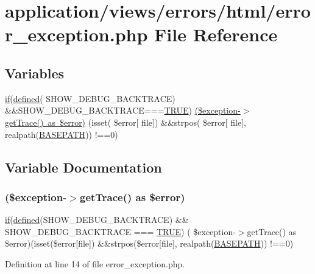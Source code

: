 \hypertarget{html_2error__exception_8php}{}\section{application/views/errors/html/error\+\_\+exception.php File Reference}
\label{html_2error__exception_8php}
\subsection*{Variables}
\begin{DoxyCompactItemize}
\item 
\mbox{\hyperlink{_code_igniter_8php_a68ca62d45495d195f67d234bdafb1d1f}{if}}(\mbox{\hyperlink{password_8php_a74f41c0efe4435fb8ac2133464d3cd57}{defined}}( \textquotesingle{}S\+H\+O\+W\+\_\+\+D\+E\+B\+U\+G\+\_\+\+B\+A\+C\+K\+T\+R\+A\+CE\textquotesingle{}) \&\&S\+H\+O\+W\+\_\+\+D\+E\+B\+U\+G\+\_\+\+B\+A\+C\+K\+T\+R\+A\+CE===\mbox{\hyperlink{constants_8php_ae04a3efe6aa42044f803ee90c2277846}{T\+R\+UE}}) \mbox{\hyperlink{html_2error__exception_8php_a4baaf90ce01e99d4aaeb31d010ddc15a}{(\$exception-\/$>$get\+Trace() as \$error)}} (isset( \$error\mbox{[} \textquotesingle{}file\textquotesingle{}\mbox{]}) \&\&strpos( \$error\mbox{[} \textquotesingle{}file\textquotesingle{}\mbox{]}, realpath(\mbox{\hyperlink{index_8php_ad39801cabfd338dc5524466fe793fda9}{B\+A\+S\+E\+P\+A\+TH}})) !==0)
\end{DoxyCompactItemize}


\subsection{Variable Documentation}
\mbox{\label{html_2error__exception_8php_a4baaf90ce01e99d4aaeb31d010ddc15a}} 
\subsubsection{\texorpdfstring{(\$exception-\/$>$getTrace() as \$error)}{($exception->getTrace() as $error)}}
{\footnotesize\ttfamily \mbox{\hyperlink{_code_igniter_8php_a68ca62d45495d195f67d234bdafb1d1f}{if}}(\mbox{\hyperlink{password_8php_a74f41c0efe4435fb8ac2133464d3cd57}{defined}}(\textquotesingle{}S\+H\+O\+W\+\_\+\+D\+E\+B\+U\+G\+\_\+\+B\+A\+C\+K\+T\+R\+A\+CE\textquotesingle{}) \&\& S\+H\+O\+W\+\_\+\+D\+E\+B\+U\+G\+\_\+\+B\+A\+C\+K\+T\+R\+A\+CE === \mbox{\hyperlink{constants_8php_ae04a3efe6aa42044f803ee90c2277846}{T\+R\+UE}}) ( \$exception-\/$>$get\+Trace() as \$error)(isset(\$error\mbox{[}\textquotesingle{}file\textquotesingle{}\mbox{]}) \&\&strpos(\$error\mbox{[}\textquotesingle{}file\textquotesingle{}\mbox{]}, realpath(\mbox{\hyperlink{index_8php_ad39801cabfd338dc5524466fe793fda9}{B\+A\+S\+E\+P\+A\+TH}})) !==0)}



Definition at line 14 of file error\+\_\+exception.\+php.


